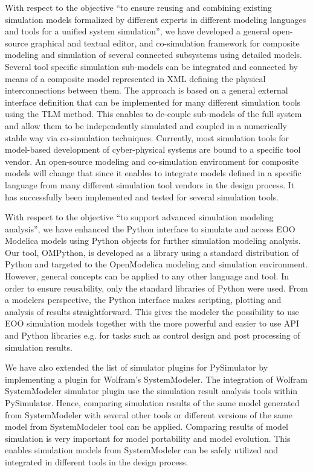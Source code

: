 With respect to the objective “to ensure reusing and combining existing simulation models formalized by different experts in different modeling languages and tools for a unified system simulation”, we have developed a general open-source graphical and textual editor, and co-simulation framework for composite modeling and simulation of several connected subsystems using detailed models. Several tool specific simulation sub-models can be integrated and connected by means of a composite model represented in XML defining the physical interconnections between them. The approach is based on a general external interface definition that can be implemented for many different simulation tools using the TLM method. This enables to de-couple sub-models of the full system and allow them to be independently simulated and coupled in a numerically stable way via co-simulation techniques. Currently, most simulation tools for model-based development of cyber-physical systems are bound to a specific tool vendor. An open-source modeling and co-simulation environment for composite models will change that since it enables to integrate models defined in a specific language from many different simulation tool vendors in the design process. It has successfully been implemented and tested for several simulation tools. 

With respect to the objective “to support advanced simulation modeling analysis”, we have enhanced the Python interface to simulate and access EOO Modelica models using Python objects for further simulation modeling analysis. Our tool, OMPython, is developed as a library using a standard distribution of Python and targeted to the OpenModelica modeling and simulation environment. However, general concepts can be applied to any other language and tool. In order to ensure reusability, only the standard libraries of Python were used. From a modelers perspective, the Python interface makes scripting, plotting and analysis of results straightforward. This gives the modeler the possibility to use EOO simulation models together with the more powerful and easier to use API and Python libraries e.g. for tasks such as control design and post processing of simulation results. 

We have also extended the list of simulator plugins for PySimulator by implementing a plugin for Wolfram’s SystemModeler. The integration of Wolfram SystemModeler simulator plugin use the simulation result analysis tools within PySimulator. Hence, comparing simulation results of the same model generated from SystemModeler with several other tools or different versions of the same model from SystemModeler tool can be applied. Comparing results of model simulation is very important for model portability and model evolution. This enables simulation models from SystemModeler can be safely utilized and integrated in different tools in the design process.

